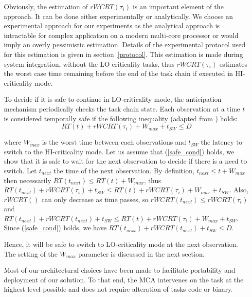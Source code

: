 \documentclass[french, a4paper, 11pt, twoside, pdftex]{StyleThese}
\begin{document}
    Obviously, the estimation of $rWCRT(\tau_i)$ is an important element of the approach. It can be done either experimentally or analytically. We choose an experimental approach for our experiments as the analytical approach is intractable for complex application on a modern multi-core processor or would imply an overly pessimistic estimation. Details of the experimental protocol used for this estimation is given in section~\ref{protocol}. %
    This estimation is made during system integration, without the LO-criticality tasks, thus $rWCRT(\tau_i)$ estimates the worst case time remaining before the end of the task chain if executed in HI-criticality mode. 

    To decide if it is safe to continue in LO-criticality mode, the anticipation mechanism periodically checks the task chain state. Each observation at a time $t$ is considered temporally safe if the following inequality (adapted from \cite{kritikakou_run-time_2014}) holds:
                \begin{equation} \label{safe_cond}
                RT(t) + rWCRT(\tau_i) + W_{max} + t_{SW} \leq D
                \end{equation} 
                 
    where $W_{max}$ is the worst time between each observations and $t_{SW}$ the latency to switch to the HI-criticality mode. Let us assume that (\ref{safe_cond}) holds, we show that it is safe to wait for the next observation to decide if there is a need to switch. Let $t_{next}$ the time of the next observation. 
    By definition, $t_{next} \leq t + W_{max}$ then necessarily $RT(t_{next}) \leq RT(t) + W_{max}$, thus  \\$RT(t_{next}) + rWCRT(\tau_i) + t_{SW} \leq RT(t) + rWCRT(\tau_i) + W_{max} + t_{SW}$. 
    Also, $rWCRT()$ can only decrease as time passes, so $rWCRT(t_{next}) \leq rWCRT(\tau_i)$ and $RT(t_{next}) + rWCRT(t_{next}) + t_{SW} \leq RT(t) + rWCRT(\tau_i) + W_{max} + t_{SW}$. 
    Since (\ref{safe_cond}) holds, we have $RT(t_{next}) + rWCRT(t_{next}) + t_{SW} \leq D$. 

    Hence, it will be safe to switch to LO-criticality mode at the next observation. The setting of the $W_{max}$ parameter is discussed in the next section.

Most of our architectural choices have been made to facilitate portability and deployment of our solution. To that end, the MCA intervenes on the task at the highest level possible and does not require alteration of tasks code or binary.
\end{document}
